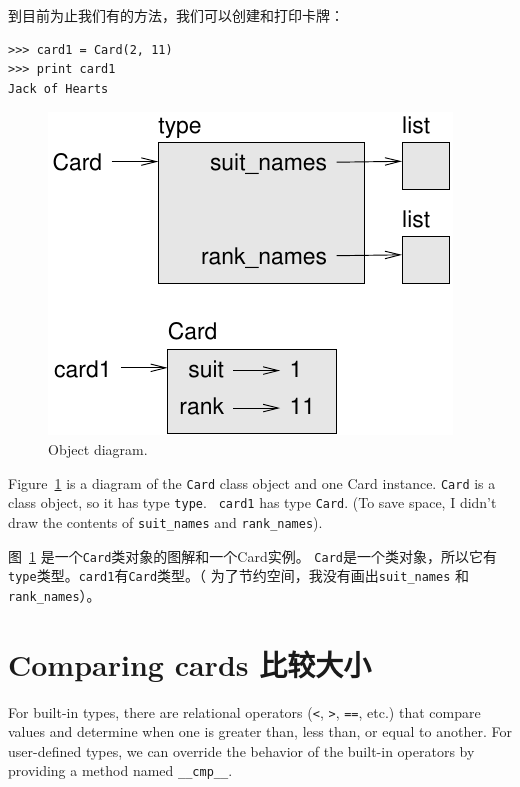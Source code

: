 \documentclass[10pt]{book}
\begin{document}
\begin{CJK}{UTF8}{gbsn}
到目前为止我们有的方法，我们可以创建和打印卡牌：

\begin{verbatim}
>>> card1 = Card(2, 11)
>>> print card1
Jack of Hearts
\end{verbatim}

\begin{figure}
\centerline
{\includegraphics[scale=0.8]{figs/card1.pdf}}
\caption{Object diagram.}
\label{fig.card1}
\end{figure}

Figure~\ref{fig.card1} is a diagram of the {\tt Card} class object
and one Card instance.
{\tt Card} is a class object, so it has type {\tt type}.  {\tt
card1} has type {\tt Card}.  (To save space, I didn't draw the
contents of \verb"suit_names" and \verb"rank_names").

图~\ref{fig.card1} 是一个{\tt Card}类对象的图解和一个Card实例。
{\tt Card}是一个类对象，所以它有{\tt type}类型。{\tt card1}有{\tt Card}类型。（
为了节约空间，我没有画出\verb"suit_names" 和 \verb"rank_names"）。


\section{Comparing cards 比较大小}
\label{comparecard}

For built-in types, there are relational operators
({\tt <}, {\tt >}, {\tt ==}, etc.)
that compare
values and determine when one is greater than, less than, or equal to
another.  For user-defined types, we can override the behavior of
the built-in operators by providing a method named
\verb"__cmp__".  


\end{CJK}
\end{document}

